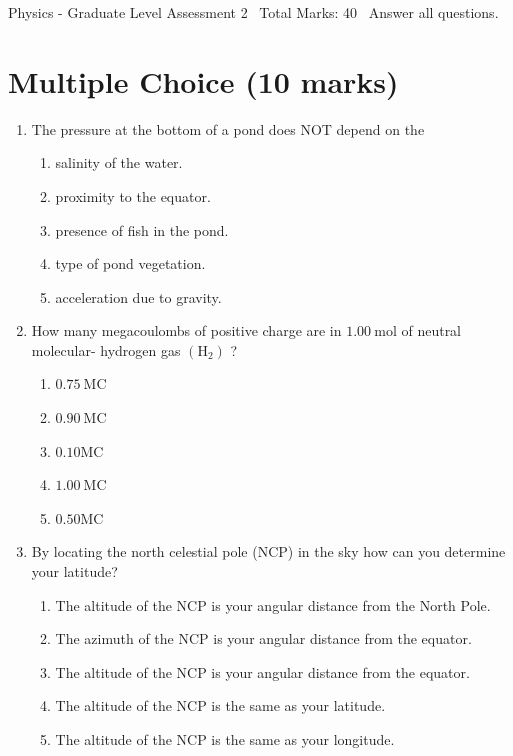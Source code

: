 \documentclass[12pt]{article}
\begin{document}
\begin{center}
Physics - Graduate Level Assessment 2 \
Total Marks: 40 \
Answer all questions.
\end{center}

\section*{Multiple Choice (10 marks)}
\begin{enumerate}[label=\arabic*.]
\item The pressure at the bottom of a pond does NOT depend on the
\begin{enumerate}[label=(\alph*)]
    \item salinity of the water.
    \item proximity to the equator.
    \item presence of fish in the pond.
    \item type of pond vegetation.
    \item acceleration due to gravity.
\end{enumerate}
\item How many megacoulombs of positive charge are in $1.00 \mathrm{~mol}$ of neutral molecular-
hydrogen gas $\left(\mathrm{H}_2\right)$ ?
\begin{enumerate}[label=(\alph*)]
    \item $0.75\ \mathrm{MC}$
    \item $0.90\ \mathrm{MC}$
    \item $0.10$$\mathrm{MC}$
    \item $1.00\ \mathrm{MC}$
    \item $0.50$$\mathrm{MC}$
\end{enumerate}
\item By locating the north celestial pole (NCP) in the sky how can you determine your latitude?
\begin{enumerate}[label=(\alph*)]
    \item The altitude of the NCP is your angular distance from the North Pole.
    \item The azimuth of the NCP is your angular distance from the equator.
    \item The altitude of the NCP is your angular distance from the equator.
    \item The altitude of the NCP is the same as your latitude.
    \item The altitude of the NCP is the same as your longitude.
\end{enumerate}

\end{enumerate}
\end{document}
